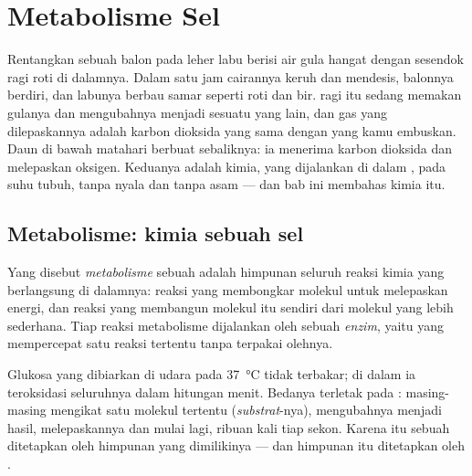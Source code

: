 \chapter{Metabolisme Sel}\label{ch:g10:cell-metabolism}

Rentangkan sebuah balon pada leher labu berisi air gula hangat dengan
sesendok ragi roti di dalamnya. Dalam satu jam cairannya keruh dan
mendesis, balonnya berdiri, dan labunya berbau samar seperti roti dan
bir.  ragi itu sedang memakan gulanya dan mengubahnya menjadi
sesuatu yang lain, dan gas yang dilepaskannya adalah karbon dioksida
yang sama dengan yang kamu embuskan. Daun di bawah matahari berbuat
sebaliknya: ia menerima karbon dioksida dan melepaskan oksigen.
Keduanya adalah kimia, yang dijalankan di dalam , pada suhu tubuh,
tanpa nyala dan tanpa asam --- dan bab ini membahas kimia itu.

\section{Metabolisme: kimia sebuah sel}

\begin{definition}[Metabolisme]\label{def:g10:cell-metabolism:metabolism}
Yang disebut \emph{metabolisme} sebuah  adalah
himpunan seluruh reaksi kimia yang berlangsung di dalamnya: reaksi yang
membongkar molekul untuk melepaskan energi, dan reaksi yang membangun
molekul  itu sendiri dari molekul yang lebih sederhana. Tiap reaksi
metabolisme dijalankan oleh sebuah \emph{enzim}, yaitu
 yang mempercepat satu reaksi tertentu tanpa terpakai olehnya.
\end{definition}

\begin{proposition}\label{prop:g10:cell-metabolism:enzymes}
Glukosa yang dibiarkan di udara pada \qty{37}{\celsius} tidak terbakar;
di dalam  ia teroksidasi seluruhnya dalam hitungan menit. Bedanya
terletak pada : masing-masing mengikat satu molekul tertentu
(\emph{substrat}-nya), mengubahnya menjadi hasil, melepaskannya dan
mulai lagi, ribuan kali tiap sekon. Karena itu  sebuah 
ditetapkan oleh himpunan  yang dimilikinya --- dan himpunan itu
ditetapkan oleh .
\end{proposition}
\admitted

